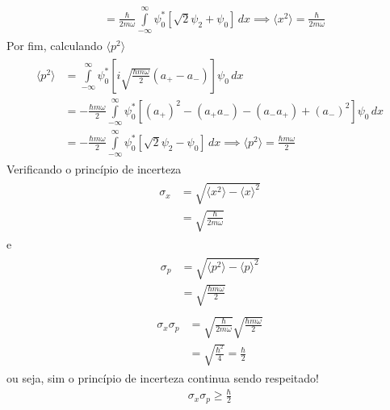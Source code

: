 \begin{prob}
\begin{sol}
\begin{enumerate}[label=\alph *)]
\begin{align}
\begin{split}
																	&= \frac{\hbar}{2m \omega}\int\limits_{-\infty}^{\infty} \psi_{0}^{*}\left[\sqrt{2} \psi_{2}+\psi_{0}\right]\,d{x}\implies \boxed{\langle x^{2} \rangle=\frac{\hbar}{2m \omega}}
						\end{split}
				\end{align}
				Por fim, calculando $\langle p^{2} \rangle$
				\begin{align}
						\begin{split}
							\langle p^{2} \rangle &= \int\limits_{-\infty}^{\infty} \psi_{0}^{*}\left[i\sqrt{\frac{\hbar m \omega}{2}}\left(a_{+}-a_{-}\right)\right] \psi_{0}\,d{x}\\
																		&= -\frac{\hbar m \omega}{2}\int\limits_{-\infty}^{\infty} \psi_{0}^{*}\left[(a_{+})^{2}-(a_{+}a_{-})-(a_{-}a_{+})+(a_{-})^{2}\right] \psi_{0}\,d{x}\\
																		&= -\frac{\hbar m \omega}{2}\int\limits_{-\infty}^{\infty} \psi_{0}^{*} \left[\sqrt{2} \psi_{2}-\psi_{0}\right]\,d{x}\implies \boxed{\langle p^{2} \rangle=\frac{\hbar m \omega}{2}}
						\end{split}
				\end{align}
				Verificando o princípio de incerteza
				\begin{align}
						\begin{split}
							\sigma_{x} &= \sqrt{\langle x^{2} \rangle-\langle x \rangle^{2}}\\
												 &= \sqrt{\frac{\hbar}{2m \omega}}
						\end{split}
				\end{align}
				e
				\begin{align}
						\begin{split}
							\sigma_{p} &= \sqrt{\langle p^{2} \rangle-\langle p \rangle^{2}}\\
												 &= \sqrt{\frac{\hbar m \omega}{2}}
						\end{split}
				\end{align}
				\begin{align}
						\begin{split}
							\sigma_{x} \sigma_{p} &= \sqrt{\frac{\hbar}{2m \omega}}\sqrt{\frac{\hbar m \omega}{2}}\\
																		&= \sqrt{\frac{\hbar^{2}}{4}}=\frac{\hbar}{2}
						\end{split}
				\end{align}
				ou seja, sim o princípio de incerteza continua sendo respeitado!
				\begin{align}
						\boxed{
							\sigma_{x} \sigma_{p}\geq \frac{\hbar}{2}
						}
				\end{align}
		\end{enumerate}

	\end{sol}
\end{prob}
